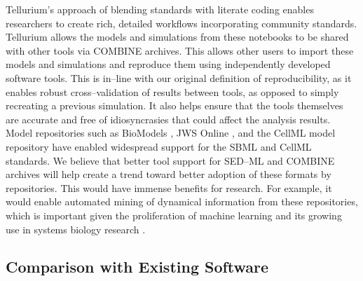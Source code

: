 \documentclass[10pt,letterpaper]{article}
\begin{document}
Tellurium's approach of blending standards with literate coding enables researchers to create rich, detailed workflows incorporating community standards. Tellurium allows the models and simulations from these notebooks to be shared with other tools via COMBINE archives. This allows other users to import these models and simulations and reproduce them using independently developed software tools. This is in--line with our original definition of reproducibility, as it enables robust cross--validation of results between tools, as opposed to simply recreating a previous simulation. It also helps ensure that the tools themselves are accurate and free of idiosyncrasies that could affect the analysis results. Model repositories such as BioModels \cite{le2006biomodels,li2010biomodels}, JWS Online \cite{olivier2004web}, and the CellML model repository \cite{lloyd2008cellml} have enabled widespread support for the SBML and CellML standards. We believe that better tool support for SED--ML and COMBINE archives will help create a trend toward better adoption of these formats by repositories. This would have immense benefits for research. For example, it would enable automated mining of dynamical information from these repositories, which is important given the proliferation of machine learning and its growing use in systems biology research \cite{angermueller2017deepcpg,jurtz2017deeplearning}.

\subsection*{Comparison with Existing Software}
\end{document}
